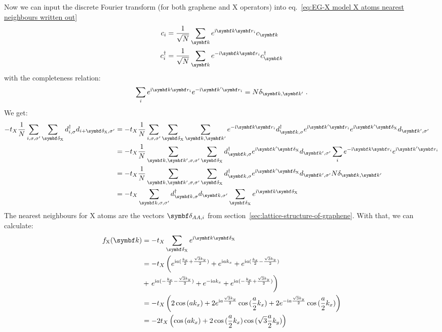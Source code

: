 \documentclass[../notes.tex]{subfiles}
\begin{document}
Now we can input the discrete Fourier transform (for both graphene and X operators) into eq.~\ref{eq:EG-X model X atoms nearest neighbours written out}
\begin{align}
	c_{i} &= \frac{1}{\sqrt{N}} \sum_{\vb{k}} e^{\iu \vb{k} \vb{r}_{i}} c_{\vb{k}} \\
	c_{i}^{\dagger} &= \frac{1}{\sqrt{N}} \sum_{\vb{k}} e^{-\iu \vb{k} \vb{r}_{i}} c_{\vb{k}}^{\dagger}
\end{align}
with the completeness relation:
\begin{equation}
	\sum_{i} e^{\iu \vb{k} \vb{r}_{i}} e^{-\iu \vb{k}^{\prime} \vb{r}_{i}} = N \delta_{\vb{k}, \vb{k}^{\prime}}
	\;.
\end{equation}
We get:
\begin{align}
	-t_X \frac{1}{N} \sum_{i,\sigma, \sigma^{\prime}} \sum_{\vb{\delta}_{\mathrm{X}}} d_{i, \sigma}^{\dagger} d_{i + \vb{\delta}_{\mathrm{X}}, \sigma^{\prime}}
	&= -t_X \frac{1}{N} \sum_{i,\sigma, \sigma^{\prime}} \sum_{\vb{\delta}_{\mathrm{X}}} \sum_{\vb{k}, \vb{k}^{\prime}} e^{-\iu \vb{k} \vb{r}_i} d_{\vb{k}, \sigma}^{\dagger} e^{\iu \vb{k}^{\prime} \vb{r}_i} e^{\iu \vb{k}^{\prime} \vb{\delta}_{\mathrm{X}}} d_{\vb{k}^{\prime}, \sigma^{\prime}} \\
	&= -t_X \frac{1}{N} \sum_{\vb{k}, \vb{k^{\prime}}, \sigma, \sigma^{\prime}} \sum_{\vb{\delta}_{\mathrm{X}}} d_{\vb{k}, \sigma}^{\dagger}  e^{\iu \vb{k}^{\prime} \vb{\delta}_{\mathrm{X}}} d_{\vb{k}^{\prime}, \sigma^{\prime}} \sum_{i} e^{-\iu \vb{k} \vb{r}_i} e^{\iu \vb{k}^{\prime} \vb{r}_i} \\
	&= -t_X \frac{1}{N} \sum_{\vb{k}, \vb{k^{\prime}}, \sigma, \sigma^{\prime}} \sum_{\vb{\delta}_{\mathrm{X}}} d_{\vb{k}, \sigma}^{\dagger}  e^{\iu \vb{k}^{\prime} \vb{\delta}_{\mathrm{X}}} d_{\vb{k}^{\prime}, \sigma^{\prime}} N \delta_{\vb{k}, \vb{k}^{\prime}} \\
	&= -t_X \sum_{\vb{k}, \sigma, \sigma^{\prime}}  d_{\vb{k}, \sigma}^{\dagger}d_{\vb{k}, \sigma^{\prime}} \sum_{\vb{\delta}_{\mathrm{X}}} e^{\iu \vb{k} \vb{\delta}_{\mathrm{X}}}
\end{align}
The nearest neighbours for \(\mathrm{X}\) atoms are the vectors \(\vb{\delta}_{AA, i}\) from section~\ref{sec:lattice-structure-of-graphene}.
With that, we can calculate:
\begin{align}
	f_{\mathrm{X}} (\vb{k}) &= -t_X \sum_{\vb{\delta}_{\mathrm{X}}} e^{\iu \vb{k} \vb{\delta}_{\mathrm{X}}} \\
	&= -t_X \left( e^{\iu a (\frac{k_x}{2} + \frac{\sqrt{3} k_y}{2})}
	+ e^{\iu a k_x}
	+ e^{\iu a (\frac{k_x}{2} - \frac{\sqrt{3} k_y}{2})}
	\right. \\
	&+ \left. e^{\iu a (-\frac{k_x}{2} - \frac{\sqrt{3} k_y}{2})}
	+ e^{-\iu a k_x}
	+ e^{\iu a (-\frac{k_x}{2} + \frac{\sqrt{3} k_y}{2})} \right) \\
	&= -t_X \left( 2 \cos{(a k_x)} + 2 e^{\iu a \frac{\sqrt{3} k_y}{2}} \cos{(\frac{a}{2} k_x)} + 2 e^{-\iu a \frac{\sqrt{3} k_y}{2}} \cos{(\frac{a}{2} k_x)} \right) \\
	&= -2t_X \left( \cos{(a k_x)} + 2 \cos{(\frac{a}{2} k_x)} \cos{(\sqrt{3} \frac{ a}{2} k_y)} \right)
\end{align}
\end{document}
